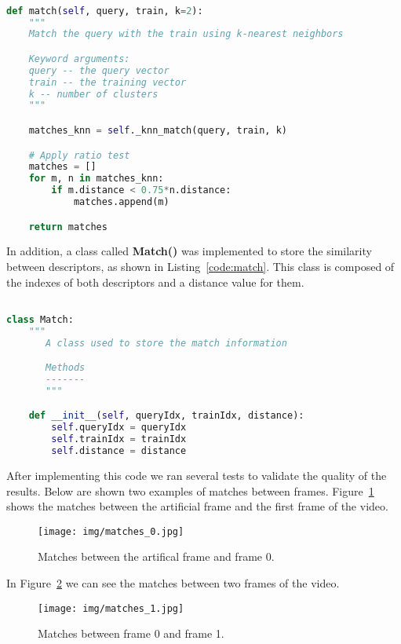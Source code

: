\documentclass[]{IEEEtran}
\begin{document}
\begin{lstlisting}[language=Python, caption={Matching Lowe's Criteria}, label={code:matching}]

def match(self, query, train, k=2):
    """
    Match the query with the train using k-nearest neighbors

    Keyword arguments:
    query -- the query vector
    train -- the training vector
    k -- number of clusters
    """

    matches_knn = self._knn_match(query, train, k)

    # Apply ratio test
    matches = []
    for m, n in matches_knn:
        if m.distance < 0.75*n.distance:
            matches.append(m)

    return matches

\end{lstlisting}

In addition, a class called \textbf{Match()} was implemented to store the similarity between descriptors, as shown in Listing~\ref{code:match}. This class is composed of the indexes of both descriptors and a distance value for them.

\begin{lstlisting}[language=Python, caption={Match Class}, label={code:match}]

class Match:
    """
       A class used to store the match information

       Methods
       -------
       """

    def __init__(self, queryIdx, trainIdx, distance):
        self.queryIdx = queryIdx
        self.trainIdx = trainIdx
        self.distance = distance

\end{lstlisting}

After implementing this code we ran several tests to validate the quality of the results. Below are shown two examples of matches between frames. Figure~\ref{fig:matches_0} shows the matches between the artificial frame and the first frame of the video.

\begin{figure}[H]
     \centering
     \texttt{[image: img/matches\_0.jpg]}
     \caption{Matches between the artifical frame and frame 0.}
     \label{fig:matches_0}
\end{figure}

In Figure~\ref{fig:matches_1} we can see the matches between two frames of the video.

\begin{figure}[H]
     \centering
     \texttt{[image: img/matches\_1.jpg]}
      \caption{Matches between frame 0 and frame 1.}
     \label{fig:matches_1}
\end{figure}
\end{document}
